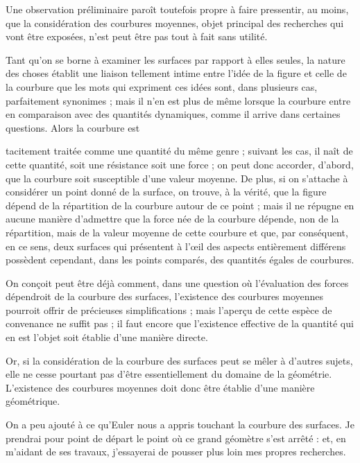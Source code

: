 \documentclass[11pt,a4paper]{article}
\begin{document}
Une observation préliminaire paroît toutefois propre à faire pressentir, au
moins, que la considération des courbures moyennes, objet principal des
recherches qui vont être exposées, n'est peut être pas tout à fait sans
utilité.

Tant qu'on se borne à examiner les surfaces par rapport à elles seules, la
nature des choses établit une liaison tellement intime entre l'idée de la
figure et celle de la courbure que les mots qui expriment ces idées sont,
dans plusieurs cas, parfaitement synonimes ; mais il n'en est plus de même
lorsque la courbure entre en comparaison avec des quantités dynamiques, comme
il arrive dans certaines questions. Alors la courbure est

tacitement traitée comme une quantité du même genre ; suivant les cas, il
naît de cette quantité, soit une résistance soit une force ; on peut donc
accorder, d'abord, que la courbure soit susceptible d'une valeur moyenne. De
plus, si on s'attache à considérer un point donné de la surface, on trouve, à
la vérité, que la figure dépend de la répartition de la courbure autour de ce
point ; mais il ne répugne en aucune manière d'admettre que la force née de
la courbure dépende, non de la répartition, mais de la valeur moyenne de
cette courbure et que, par conséquent, en ce sens, deux surfaces qui
présentent à l'œil des aspects entièrement différens possèdent cependant,
dans les points comparés, des quantités égales de courbures.

On conçoit peut être déjà comment, dans une question où l'évaluation des
forces dépendroit de la courbure des surfaces, l'existence des courbures
moyennes pourroit offrir de précieuses simplifications ; mais l'aperçu de
cette espèce de convenance ne suffit pas ; il faut encore que l'existence
effective de la quantité qui en est l'objet soit établie d'une manière
directe.

Or, si la considération de la courbure des surfaces peut se mêler à d'autres
sujets, elle ne cesse pourtant pas d'être essentiellement du domaine de la
géométrie. L'existence des courbures moyennes doit donc être établie d'une
manière géométrique.


On a peu ajouté à ce qu'Euler nous a appris touchant la courbure des
surfaces. Je prendrai pour point de départ le point où ce grand géomètre
s'est arrêté : et, en m'aidant de ses travaux, j'essayerai de pousser plus
loin mes propres recherches.
\end{document}
